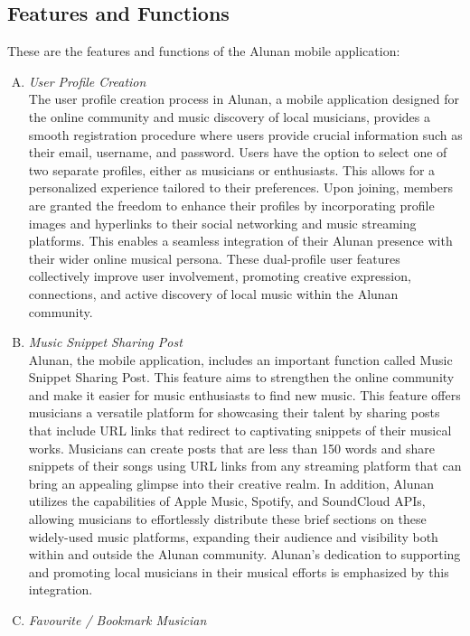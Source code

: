\subsection{Features and Functions}
These are the features and functions of the Alunan mobile application:
\begin{enumerate}[A.]
    \item \textit{User Profile Creation}\\
    The user profile creation process in Alunan, a mobile application designed for the online community and music discovery of local musicians, provides a smooth registration procedure where users provide crucial information such as their email, username, and password. Users have the option to select one of two separate profiles, either as musicians or enthusiasts. This allows for a personalized experience tailored to their preferences. Upon joining, members are granted the freedom to enhance their profiles by incorporating profile images and hyperlinks to their social networking and music streaming platforms. This enables a seamless integration of their Alunan presence with their wider online musical persona. These dual-profile user features collectively improve user involvement, promoting creative expression, connections, and active discovery of local music within the Alunan community.
    \item \textit{Music Snippet Sharing Post}\\
    Alunan, the mobile application, includes an important function called Music Snippet Sharing Post. This feature aims to strengthen the online community and make it easier for music enthusiasts to find new music. This feature offers musicians a versatile platform for showcasing their talent by sharing posts that include URL links that redirect to captivating snippets of their musical works. Musicians can create posts that are less than 150 words and share snippets of their songs using URL links from any streaming platform that can bring an appealing glimpse into their creative realm. In addition, Alunan utilizes the capabilities of Apple Music, Spotify, and SoundCloud APIs, allowing musicians to effortlessly distribute these brief sections on these widely-used music platforms, expanding their audience and visibility both within and outside the Alunan community. Alunan's dedication to supporting and promoting local musicians in their musical efforts is emphasized by this integration.
    \item \textit{Favourite / Bookmark Musician}\\

\end{enumerate}
